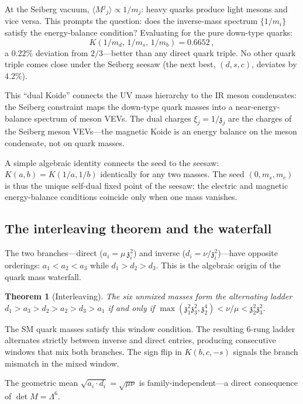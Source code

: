 \documentclass[12pt,a4paper]{article}
\newtheorem{theorem}{Theorem}
\newcommand{\zch}{\mathfrak{z}}
\begin{document}
At the Seiberg vacuum, $\langle M^j{}_j \rangle \propto 1/m_j$:
heavy quarks produce light mesons and vice versa.
This prompts the question: does the inverse-mass spectrum
$\{1/m_i\}$ satisfy the energy-balance condition?
Evaluating for the pure down-type quarks:
\begin{equation}
  K(1/m_d,\, 1/m_s,\, 1/m_b) = 0.6652\,,
  \label{eq:dual_koide}
\end{equation}
a $0.22\%$ deviation from $2/3$---better than any direct quark
triple.
No other quark triple comes close under the Seiberg seesaw
(the next best, $(d,s,c)$, deviates by $4.2\%$).

This ``dual Koide'' connects the UV mass hierarchy to the IR
meson condensates: the Seiberg constraint maps the down-type
quark masses into a near-energy-balance spectrum of meson VEVs.
The dual charges $\xi_j = 1/\zch_j$ are the charges of the
Seiberg meson VEVs---the magnetic Koide is an energy balance
on the meson condensate, not on quark masses.

A simple algebraic identity connects the seed to the seesaw:
$K(a, b) = K(1/a, 1/b)$ identically for any two masses.
The seed $(0, m_s, m_c)$ is thus the unique self-dual fixed point
of the seesaw: the electric and magnetic energy-balance conditions
coincide only when one mass vanishes.

\subsection{The interleaving theorem and the waterfall}

The two branches---direct ($a_i = \mu\,\zch_i^2$) and
inverse ($d_i = \nu/\zch_i^2$)---have opposite orderings:
$a_1 < a_2 < a_3$ while $d_1 > d_2 > d_3$.
This is the algebraic origin of the quark mass waterfall.

\begin{theorem}[Interleaving]
The six unmixed masses form the alternating ladder
$d_1 > a_3 > d_2 > a_2 > d_3 > a_1$
if and only if
$\max(\zch_1^2\zch_3^2, \zch_2^4) < \nu/\mu < \zch_2^2\zch_3^2$.
\end{theorem}

The SM quark masses satisfy this window condition.
The resulting 6-rung ladder alternates strictly between inverse
and direct entries, producing consecutive windows that mix both
branches.
The sign flip in $K(b,c,-s)$ signals the branch mismatch in the
mixed window.

The geometric mean $\sqrt{a_i \cdot d_i} = \sqrt{\mu\nu}$ is
family-independent---a direct consequence of $\det M = \Lambda^6$.
\end{document}
